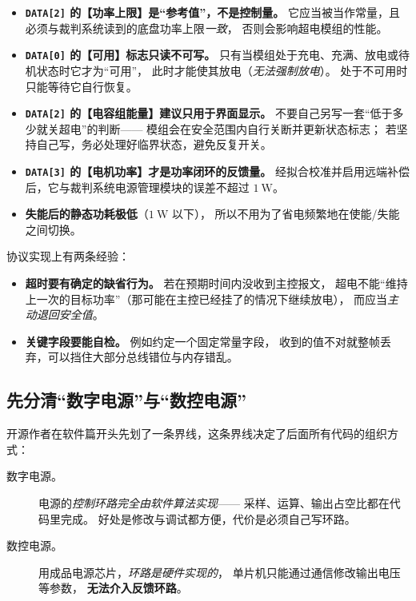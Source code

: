 \documentclass[cn,blue,11pt,device=normal]{elegantnote}
\begin{document}
\begin{note}[协议里几个容易用错的地方]
\begin{itemize}
  \item \textbf{\texttt{DATA[2]} 的【功率上限】是“参考值”，不是控制量。}
  它应当被当作常量，且必须与裁判系统读到的底盘功率上限\emph{一致}，
  否则会影响超电模组的性能。
  \item \textbf{\texttt{DATA[0]} 的【可用】标志只读不可写。}
  只有当模组处于充电、充满、放电或待机状态时它才为“可用”，
  此时才能使其放电（\emph{无法强制放电}）。
  处于不可用时只能等待它自行恢复。
  \item \textbf{\texttt{DATA[2]} 的【电容组能量】建议只用于界面显示。}
  不要自己另写一套“低于多少就关超电”的判断——
  模组会在安全范围内自行关断并更新状态标志；
  若坚持自己写，务必处理好临界状态，避免反复开关。
  \item \textbf{\texttt{DATA[3]} 的【电机功率】才是功率闭环的反馈量。}
  经拟合校准并启用远端补偿后，它与裁判系统电源管理模块的误差不超过 $1\ \mathrm{W}$。
  \item \textbf{失能后的静态功耗极低}（$1\ \mathrm{W}$ 以下），
  所以不用为了省电频繁地在使能/失能之间切换。
\end{itemize}
\end{note}

协议实现上有两条经验：

\begin{itemize}
  \item \textbf{超时要有确定的缺省行为。} 若在预期时间内没收到主控报文，
  超电不能“维持上一次的目标功率”（那可能在主控已经挂了的情况下继续放电），
  而应当\emph{主动退回安全值}。
  \item \textbf{关键字段要能自检。} 例如约定一个固定常量字段，
  收到的值不对就整帧丢弃，可以挡住大部分总线错位与内存错乱。
\end{itemize}

\subsection{先分清“数字电源”与“数控电源”}

开源作者在软件篇开头先划了一条界线，这条界线决定了后面所有代码的组织方式：

\begin{description}
  \item[数字电源。] 电源的\emph{控制环路完全由软件算法实现}——
  采样、运算、输出占空比都在代码里完成。
  好处是修改与调试都方便，代价是必须自己写环路。
  \item[数控电源。] 用成品电源芯片，\emph{环路是硬件实现的}，
  单片机只能通过通信修改输出电压等参数，
  \textbf{无法介入反馈环路}。
\end{description}
\end{document}
